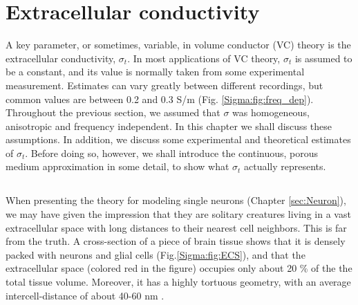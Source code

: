 \section{Extracellular conductivity}
\label{sec:Sigma}

A key parameter, or sometimes, variable, in volume conductor (VC) theory is the extracellular conductivity, $\sigma_t$. In most applications of VC theory, $\sigma_t$ is assumed to be a constant, and its value is normally taken from some experimental measurement. Estimates can vary greatly between different recordings, but common values are between 0.2 and 0.3 S/m (Fig. \ref{Sigma:fig:freq_dep}). Throughout the previous section, we assumed that  $\sigma$  was homogeneous, anisotropic and frequency independent. In this chapter we shall discuss these assumptions. In addition, we discuss some experimental and theoretical estimates of  $\sigma_t$. Before doing so, however, we shall introduce the continuous, porous medium approximation in some detail, to show what $\sigma_t$ actually represents.


\subsection{}
\label{sec:Sigma:continuous}

When presenting the theory for modeling single neurons (Chapter \ref{sec:Neuron}), we may have given the impression that they are solitary creatures living in a vast extracellular space with long distances to their nearest cell neighbors. This is far from the truth. A cross-section of a piece of brain tissue shows that it is densely packed with neurons and glial cells (Fig.\ref{Sigma:fig:ECS}), and that the extracellular space (colored red in the figure) occupies only about 20 \% of the the total tissue volume. Moreover, it has a highly tortuous  geometry, with an average intercell-distance of about 40-60 nm \citep{Sykova2008}. 

